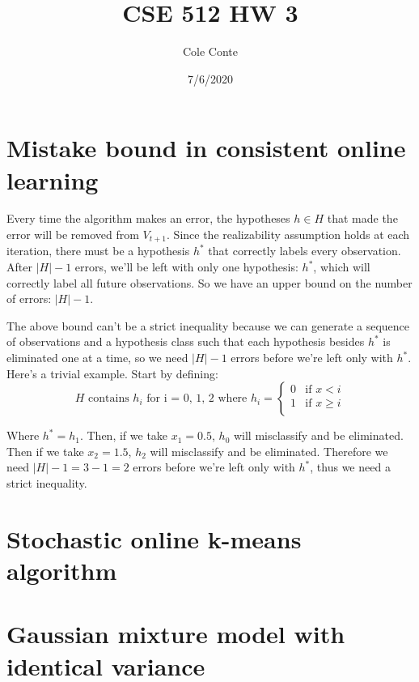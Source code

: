 \documentclass{article}
\begin{document}
\title{CSE 512 HW 3}
\author{Cole Conte}
\date{7/6/2020}

\maketitle

\section{Mistake bound in consistent online learning}
Every time the algorithm makes an error, the hypotheses \(h \in H\) that made the error will be removed from \(V_{t+1}\). Since the realizability assumption holds at each iteration, there must be a hypothesis \(h^*\) that correctly labels every observation. After \(|H| - 1 \) errors, we'll be left with only one hypothesis: \(h^*\), which will correctly label all future observations. So we have an upper bound on the number of errors: \(|H| - 1 \).

The above bound can't be a strict inequality because we can generate a sequence of observations and a hypothesis class such that each hypothesis besides \(h^*\) is eliminated one at a time, so we need \(|H| - 1 \) errors before we're left only with  \(h^* \). Here's a trivial example. Start by defining:
\begin{equation}
H  \text{ contains } h_i \text{ for i = 0, 1, 2 where }
h_i =
 \begin{cases}
                                   0 & \text{if $x<i$} \\
                                   1 & \text{if $x \geq i$} \\
                                   
\end{cases}
\end{equation}

Where \(h^*=h_1\). Then, if we take \(x_1 = 0.5\), \(h_0\) will misclassify and be eliminated. Then if we take \(x_2 = 1.5\), \(h_2\) will misclassify and be eliminated. Therefore we need \(|H| - 1 = 3-1 = 2\)  errors before we're left only with  \(h^* \), thus we need a strict inequality.

\section{Stochastic online k-means algorithm}

\section{Gaussian mixture model with identical variance}
\end{document}
